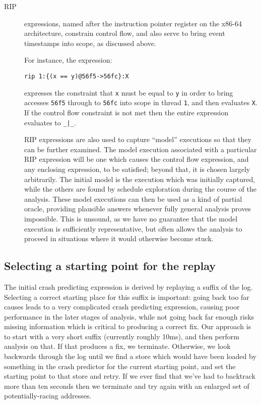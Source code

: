 \documentclass[10pt,a4paper,twocolumn]{article}
\begin{document}
\begin{description}
\item[RIP] expressions, named after the instruction pointer register
  on the x86-64 architecture, constrain control flow, and also serve
  to bring event timestamps into scope, as discussed above.

  For instance, the expression:

\begin{verbatim}
rip 1:{(x == y)@56f5->56fc}:X
\end{verbatim}

  expresses the constraint that \verb|x| must be equal to \verb|y| in
  order to bring accesses \verb|56f5| through to \verb|56fc| into
  scope in thread \verb|1|, and then evaluates \verb|X|.  If the
  control flow constraint is not met then the entire expression
  evaluates to \verb^_|_^.

  RIP expressions are also used to capture ``model'' executions so
  that they can be further examined.  The model execution associated
  with a particular RIP expression will be one which causes the
  control flow expression, and any enclosing expression, to be
  satisfied; beyond that, it is chosen largely arbitrarily.  The
  initial model is the execution which was initially captured, while
  the others are found by schedule exploration during the course of
  the analysis.  These model executions can then be used as a kind of
  partial oracle, providing plausible answers whenever fully general
  analysis proves impossible.  This is unsound, as we have no
  guarantee that the model execution is sufficiently representative,
  but often allows the analysis to proceed in situations where it
  would otherwise become stuck.

\end{description}

\subsection{Selecting a starting point for the replay}

The initial crash predicting expression is derived by replaying a
suffix of the log.  Selecting a correct starting place for this suffix
is important: going back too far causes leads to a very complicated
crash predicting expression, causing poor performance in the later
stages of analysis, while not going back far enough risks missing
information which is critical to producing a correct fix.  Our
approach is to start with a very short suffix (currently roughly
10ms), and then perform analysis on that.  If that produces a fix, we
terminate.  Otherwise, we look backwards through the log until we find
a store which would have been loaded by something in the crash
predictor for the current starting point, and set the starting point
to that store and retry.  If we ever find that we've had to backtrack
more than ten seconds then we terminate and try again with an enlarged
set of potentially-racing addresses.
\end{document}
